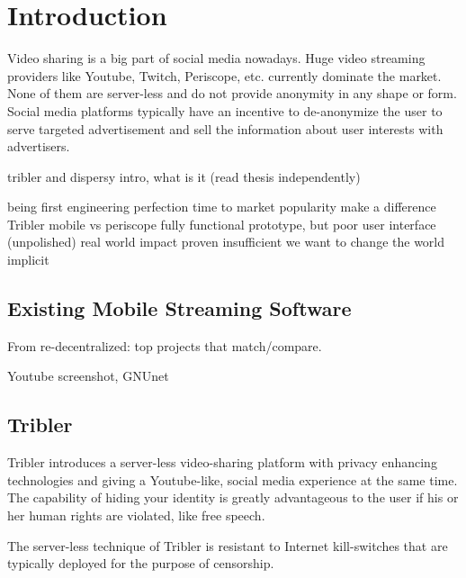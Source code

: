 

\chapter{Introduction}

Video sharing is a big part of social media nowadays.
Huge video streaming providers like Youtube, Twitch, Periscope, etc. currently dominate the market.
None of them are server-less and do not  provide anonymity in any shape or form.
Social media platforms typically have an incentive to de-anonymize the user to serve targeted advertisement and sell the information about user interests with advertisers.


tribler and dispersy intro, what is it (read thesis independently)


being first
engineering perfection
time to market
popularity
make a difference
Tribler mobile vs periscope
fully functional prototype, but poor user interface (unpolished)
real world impact proven insufficient
we want to change the world implicit


\section{Existing Mobile Streaming Software}
From re-decentralized: top projects that match/compare.

Youtube screenshot, GNUnet


\section{Tribler}
Tribler introduces a server-less video-sharing platform with privacy enhancing technologies and giving a Youtube-like, social media experience at the same time.
The capability of hiding your identity is greatly advantageous to the user if his or her human rights are violated, like free speech.

The server-less technique of Tribler is resistant to Internet kill-switches that are typically deployed for the purpose of censorship.


